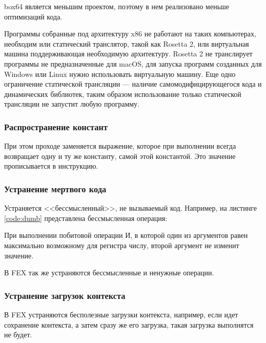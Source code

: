 box64 является меньшим проектом, поэтому в нем реализовано меньше оптимизаций кода.

Программы собранные под архитектуру x86 не работают на таких компьютерах, необходим или статический транслятор, такой как Rosetta 2, или виртуальная машина поддерживающая необходимую архитектуру. Rosetta 2 не транслирует программы не предназначенные для macOS, для запуска программ созданных для Windows или Linux нужно использовать виртуальную машину. Еще одно ограничение статической трансляции --- наличие самомодифицирующегося кода и динамических библиотек, таким образом использование только статической трансляции не запустит любую программу. \cite{fast_bin}

\subsubsection{Распространение констант}

При этом проходе заменяется выражение, которое при выполнении всегда возвращает одну и ту же константу, самой этой константой. Это значение прописывается в инструкцию.

\subsubsection{Устранение мертвого кода}

Устраняется <<бессмысленный>>, не вызываемый код.
Например, на листинге \ref{code:dumb} представлена бессмысленная операция:

При выполнении побитовой операции И, в которой один из аргументов равен максимально возможному для регистра числу, второй аргумент не изменит значение.

В FEX так же устраняются бессмысленные и ненужные операции.

\subsubsection{Устранение загрузок контекста}

В FEX устраняются бесполезные загрузки контекста, например, если идет сохранение контекста, а затем сразу же его загрузка, такая загрузка выполнятся не будет. 

